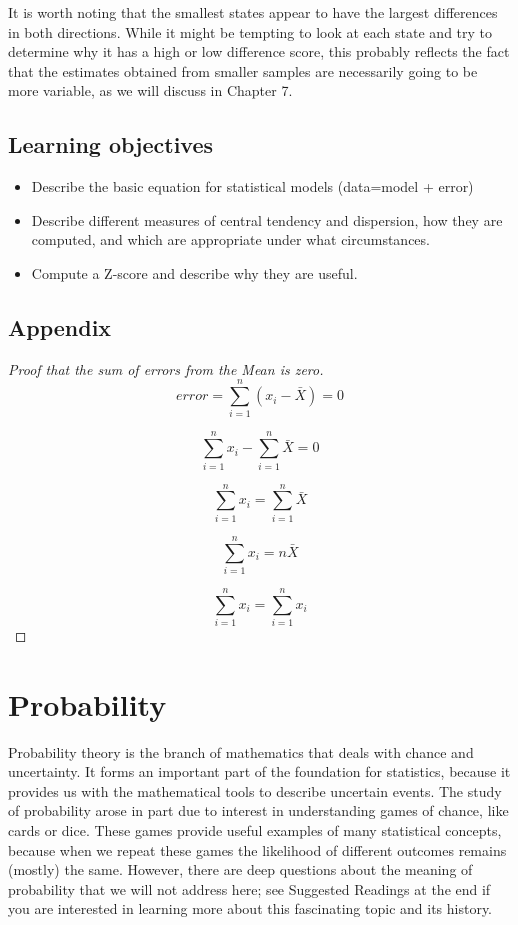\documentclass[12pt,]{book}
\providecommand{\tightlist}{%
  \setlength{\itemsep}{0pt}\setlength{\parskip}{0pt}}
\theoremstyle{definition}
\theoremstyle{definition}
\theoremstyle{definition}
\theoremstyle{remark}
\let\BeginKnitrBlock\begin \let\EndKnitrBlock\end
\begin{document}
It is worth noting that the smallest states appear to have the largest differences in both directions. While it might be tempting to look at each state and try to determine why it has a high or low difference score, this probably reflects the fact that the estimates obtained from smaller samples are necessarily going to be more variable, as we will discuss in Chapter 7.

\hypertarget{learning-objectives-4}{%
\section{Learning objectives}\label{learning-objectives-4}}

\begin{itemize}
\tightlist
\item
  Describe the basic equation for statistical models (data=model + error)
\item
  Describe different measures of central tendency and dispersion, how they are computed, and which are appropriate under what circumstances.
\item
  Compute a Z-score and describe why they are useful.
\end{itemize}

\hypertarget{appendix-1}{%
\section{Appendix}\label{appendix-1}}

\BeginKnitrBlock{proof}[Proof that the sum of errors from the Mean is zero]
{}
\[
error = \sum_{i=1}^{n}(x_i - \bar{X}) = 0
\]

\[
\sum_{i=1}^{n}x_i - \sum_{i=1}^{n}\bar{X}=0
\]

\[
\sum_{i=1}^{n}x_i = \sum_{i=1}^{n}\bar{X}
\]

\[
\sum_{i=1}^{n}x_i = n\bar{X}
\]

\[
\sum_{i=1}^{n}x_i = \sum_{i=1}^{n}x_i
\]
\EndKnitrBlock{proof}

\hypertarget{probability}{%
\chapter{Probability}\label{probability}}

Probability theory is the branch of mathematics that deals with chance and uncertainty. It forms an important part of the foundation for statistics, because it provides us with the mathematical tools to describe uncertain events. The study of probability arose in part due to interest in understanding games of chance, like cards or dice. These games provide useful examples of many statistical concepts, because when we repeat these games the likelihood of different outcomes remains (mostly) the same. However, there are deep questions about the meaning of probability that we will not address here; see Suggested Readings at the end if you are interested in learning more about this fascinating topic and its history.
\end{document}
